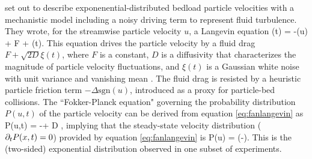 \citet{Fan2014} set out to describe exponenential-distributed bedload particle velocities with a mechanistic model including a noisy driving term to represent fluid turbulence.
They wrote, for the streamwise particle velocity $u$, a Langevin equation
\be {}(t) = -\Delta {}(u) + F + \xi(t). \label{eq:fanlangevin}\ee
This equation drives the particle velocity by a fluid drag $F + \sqrt{2D} \xi(t)$, where $F$ is a constant, $D$ is a diffusivity that characterizes the magnitude of particle velocity fluctuations, and $\xi(t)$ is a Gaussian white noise with unit variance and vanishing mean \citep{Gardiner1983}. The fluid drag is resisted by a heuristic particle friction term $-\Delta \text{sgn}(u)$, introduced as a proxy for particle-bed collisions. The ``Fokker-Planck equation" governing the probability distribution $P(u,t)$ of the particle velocity can be derived from equation \ref{eq:fanlangevin} as \citep{Risken1989,VanKampen2007} 
\be {} P(u,t) = -\Delta{} + D ,\ee
implying that the steady-state velocity distribution ($\partial_t P(x,t) = 0$) provided by equation \ref{eq:fanlangevin} is
\be P(u) = \exp\Big(-\Big).\ee
This is the (two-sided) exponential distribution observed in one subset of experiments.

